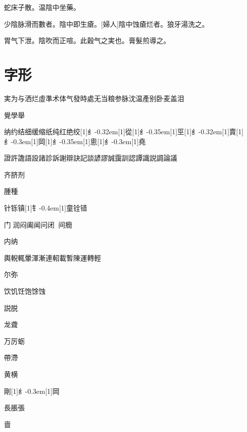 \documentclass[11pt,oneside,b5paper]{ctexbook}
\begin{document}
\begin{flushleft}
蛇床子散。温陰中坐藥。

少陰脉滑而數者。陰中即生瘡。[婦人]陰中蚀瘡烂者。狼牙湯洗之。

胃气下泄。陰吹而正喧。此穀气之実也。膏髮煎導之。

\chapter{字形}

実为与洒烂虛準术体气發時處无当粮参脉沈温產别卧麦盖泪{𧌒}{𩊅}

覺學舉

纳约结细缓缩纸纯红绝绞{\hbox{\scalebox{0.6}[1]{纟}\kern-0.32em\scalebox{0.7}[1]{從}}}{\hbox{\scalebox{0.68}[1]{纟}\kern-0.35em\scalebox{0.64}[1]{巠}}}{\hbox{\scalebox{0.6}[1]{纟}\kern-0.32em\scalebox{0.7}[1]{賣}}}{\hbox{\scalebox{0.6}[1]{纟}\kern-0.3em\scalebox{0.63}[1]{岡}}}{\hbox{\scalebox{0.65}[1]{纟}\kern-0.35em\scalebox{0.68}[1]{悤}}}{\hbox{\scalebox{0.6}[1]{纟}\kern-0.3em\scalebox{0.63}[1]{堯}}}

證許譫語設諸診訴謝辯訣記談諺謬誠靄訓認譚識説調論議

齐脐剂

腫種

针铄镇{\hbox{\scalebox{0.7}[1]{钅}\kern-0.4em\scalebox{0.7}[1]{童}}}铨错

门{𥆧}润闷阖闻问闭{𫔭}{𬮦}间癇

内纳

輿輗輒暈渾漸連軺載暫陳運轉輕

尔弥

饮饥饪饱馀蚀

説脱

龙聋

万厉蛎

帶滯

黄横

剛{\hbox{\scalebox{0.6}[1]{纟}\kern-0.3em\scalebox{0.63}[1]{岡}}}

長脹張

啬{𬈧}
\end{flushleft}
\end{document}
